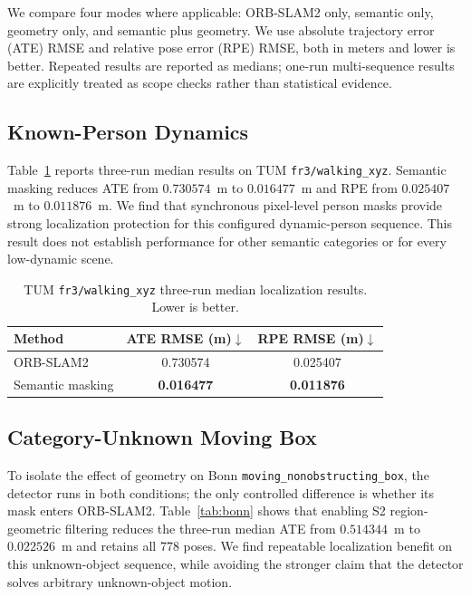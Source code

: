 \documentclass[10pt]{article}
\begin{document}
We compare four modes where applicable: ORB-SLAM2 only, semantic only, geometry only, and semantic plus geometry. We use absolute trajectory error (ATE) RMSE and relative pose error (RPE) RMSE, both in meters and lower is better. Repeated results are reported as medians; one-run multi-sequence results are explicitly treated as scope checks rather than statistical evidence.

\subsection{Known-Person Dynamics}

Table~\ref{tab:tum} reports three-run median results on TUM \texttt{fr3/walking\_xyz}. Semantic masking reduces ATE from $0.730574$~m to $0.016477$~m and RPE from $0.025407$~m to $0.011876$~m. We find that synchronous pixel-level person masks provide strong localization protection for this configured dynamic-person sequence. This result does not establish performance for other semantic categories or for every low-dynamic scene.

\begin{table}[t]
\centering
\caption{TUM \texttt{fr3/walking\_xyz} three-run median localization results. Lower is better.}
\label{tab:tum}
\begin{tabular}{lcc}
\toprule
Method & ATE RMSE (m)$\downarrow$ & RPE RMSE (m)$\downarrow$\\
\midrule
ORB-SLAM2 & 0.730574 & 0.025407\\
Semantic masking & \textbf{0.016477} & \textbf{0.011876}\\
\bottomrule
\end{tabular}
\end{table}

\subsection{Category-Unknown Moving Box}

To isolate the effect of geometry on Bonn \texttt{moving\_nonobstructing\_box}, the detector runs in both conditions; the only controlled difference is whether its mask enters ORB-SLAM2. Table~\ref{tab:bonn} shows that enabling S2 region-geometric filtering reduces the three-run median ATE from $0.514344$~m to $0.022526$~m and retains all 778 poses. We find repeatable localization benefit on this unknown-object sequence, while avoiding the stronger claim that the detector solves arbitrary unknown-object motion.
\end{document}
